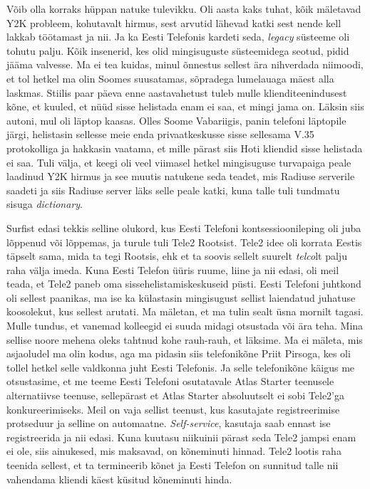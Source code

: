 Võib olla korraks hüppan natuke tulevikku. Oli aasta kaks tuhat, kõik mäletavad 
Y2K probleem, kohutavalt hirmus, sest arvutid 
lähevad katki sest nende kell  lakkab töötamast ja nii. Ja ka Eesti Telefonis 
kardeti seda,  \emph{legacy} süsteeme oli tohutu palju. Kõik insenerid, kes 
olid mingisuguste süsteemidega seotud, pidid jääma  valvesse. Ma ei tea kuidas, 
minul õnnestus sellest ära nihverdada niimoodi, et tol hetkel ma olin Soomes 
suusatamas, sõpradega lumelauaga mäest alla laskmas. Stiilis paar päeva enne 
aastavahetust tuleb mulle  klienditeenindusest kõne, et kuuled, et nüüd sisse 
helistada enam ei saa, et mingi jama on. Läksin siis autoni, mul oli läptop 
kaasas. Olles Soome Vabariigis, panin telefoni läptopile järgi, helistasin 
sellesse meie enda privaatkeskusse sisse sellesama V.35  protokolliga ja 
hakkasin  vaatama, et mille pärast siis Hoti kliendid sisse helistada ei saa. 
Tuli välja, et keegi oli veel viimasel hetkel mingisuguse turvapaiga peale 
laadinud Y2K hirmus ja see muutis natukene seda teadet, mis Radiuse serverile 
saadeti ja siis Radiuse server läks selle peale katki, kuna talle tuli tundmatu 
sisuga \emph{dictionary}.

Surfist edasi tekkis selline olukord, kus Eesti Telefoni kontsessioonileping 
oli juba lõppenud või lõppemas, ja turule tuli Tele2 Rootsist. 
Tele2  idee oli korrata Eestis täpselt sama, mida ta tegi Rootsis, ehk et ta 
soovis sellelt suurelt \emph{telco}lt palju raha välja imeda. Kuna Eesti 
Telefon üüris ruume, liine ja nii edasi, oli meil teada, et Tele2 paneb oma 
sissehelistamiskeskuseid püsti. Eesti Telefoni juhtkond oli sellest paanikas, 
ma ise ka külastasin mingisugust sellist laiendatud juhatuse koosolekut, kus 
sellest arutati. Ma mäletan, et ma tulin sealt üsna mornilt tagasi. Mulle 
tundus, et vanemad kolleegid ei suuda  midagi otsustada või ära teha. Mina 
sellise noore mehena oleks tahtnud kohe rauh-rauh, et läksime. Ma ei mäleta, 
mis asjaoludel ma olin kodus, aga ma pidasin siis telefonikõne Priit 
Pirsoga, kes oli tollel hetkel selle valdkonna juht 
Eesti Telefonis. Ja selle telefonikõne käigus me otsustasime, et me teeme Eesti 
Telefoni osutatavale Atlas Starter teenusele alternatiivse teenuse, sellepärast 
et Atlas Starter absoluutselt ei sobi Tele2'ga konkureerimiseks. Meil on vaja 
sellist teenust, kus kasutajate  registreerimise protseduur ja selline on 
automaatne. \emph{Self-service}, kasutaja saab ennast ise registreerida ja nii 
edasi. Kuna  kuutasu niikuinii pärast seda Tele2 jampsi enam ei ole, siis 
ainukesed, mis maksavad, on kõneminuti hinnad. Tele2  lootis  raha teenida 
sellest, et ta termineerib kõnet ja Eesti Telefon on sunnitud talle 
nii vahendama kliendi käest küsitud kõneminuti hinda. 

